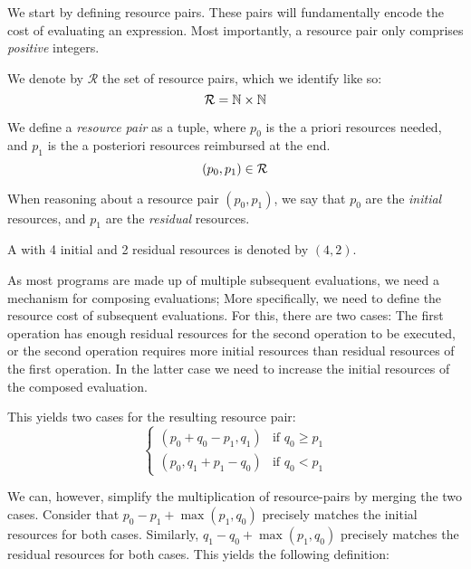 We start by defining resource pairs. These pairs will fundamentally encode the cost of evaluating an expression. Most importantly, a resource pair only comprises \emph{positive} integers. 

\begin{definition}[Resources]
   We denote by \(\mathcal{R}\) the set of resource pairs, which we identify like so:
   \[
      \mathcal{R} = \mathbb{N} \times \mathbb{N}
   \]
\end{definition}

\begin{definition}
   \label{def:resource-pair}
   We define a \emph{resource pair} as a tuple, where \(p_0\) is the a priori resources needed, and \(p_1\) is the a posteriori resources reimbursed at the end.
   \[
      (p_0, p_1) \in \mathcal{R}
   \]
\end{definition}

When reasoning about a resource pair \((p_0, p_1)\), we say that \(p_0\) are the \emph{initial} resources, and \(p_1\) are the \emph{residual} resources. 

\begin{example}
   A  with 4 initial and 2 residual resources is denoted by \((4, 2)\). 
   
\end{example}

As most programs are made up of multiple subsequent evaluations, we need a mechanism for composing evaluations; More specifically, we need to define the resource cost of subsequent evaluations. 
For this, there are two cases: The first operation has enough residual resources for the second operation to be executed, or the second operation requires more initial resources than residual resources of the first operation. In the latter case we need to increase the initial resources of the composed evaluation.

This yields two cases for the resulting resource pair:
\[
   \begin{cases}
      (p_0 + q_0 - p_1,  q_1) & \mbox{if } q_0 \geq p_1 \\
      (p_0,q_1 + p_1 - q_0) & \mbox{if } q_0 <    p_1 
   \end{cases}
\]

We can, however, simplify the multiplication of resource-pairs by merging the two cases. Consider that \(p_0 - p_1 + \max(p_1, q_0)\) precisely matches the initial resources for both cases. Similarly, \(q_1 - q_0 + \max(p_1, q_0)\) precisely matches the residual resources for both cases. 
This yields the following definition:

